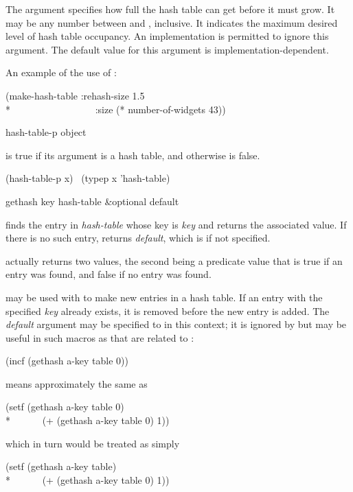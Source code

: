 \begin{defun}[Function]
The  argument
specifies how full the hash table can get before it must grow.
It may be any  number between  and , inclusive.
It indicates the maximum desired level of hash table occupancy.
An implementation is permitted to ignore this argument.
The default value for this argument is implementation-dependent.

An example of the use of :
\begin{lisp}
(make-hash-table :rehash-size 1.5 \\*
~~~~~~~~~~~~~~~~~:size (* number-of-widgets 43))
\end{lisp}
\end{defun}

\begin{defun}[Function]
hash-table-p object

 is true if its argument is a hash table,
and otherwise is false.
\begin{lisp}
(hash-table-p x) \EQ\ (typep x 'hash-table)
\end{lisp}
\end{defun}

\begin{defun}[Function]
gethash key hash-table &optional default

 finds the entry in \emph{hash-table} whose key is \emph{key}
and returns the
associated value.  If there is no such entry,  returns \emph{default},
which is {\false} if not specified.

 actually returns two values, the second being a predicate
value that is true if an entry was found, and false if no entry was found.

 may be used with  to make new entries in a hash
table.  If an entry with the specified \emph{key} already exists, it is
removed before the new entry is added.  The \emph{default} argument may be
specified to  in this context; it is ignored by 
but may be useful in such macros as  that are related to :
\begin{lisp}
(incf (gethash a-key table 0))
\end{lisp}
means approximately the same as
\begin{lisp}
(setf (gethash a-key table 0) \\*
~~~~~~(+ (gethash a-key table 0) 1))
\end{lisp}
which in turn would be treated as simply
\begin{lisp}
(setf (gethash a-key table) \\*
~~~~~~(+ (gethash a-key table 0) 1))
\end{lisp}
\end{defun}

